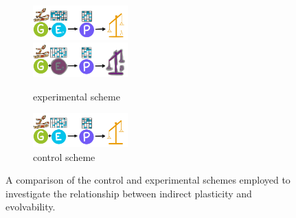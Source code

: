 \begin{figure}
  \centering
  \begin{subfigure}[b]{\textwidth}
    \centering
    \includegraphics[width=0.4\textwidth]{img/indirectschemeA} \\
    \includegraphics[width=0.4\textwidth]{img/indirectschemeB}
    \caption{experimental scheme}
    \label{subfig:directscheme}
  \end{subfigure}
  \hfill
  \begin{subfigure}[b]{\textwidth}
    \centering
    \includegraphics[width=0.4\textwidth]{img/modelscheme}
    \caption{control scheme}
     \label{subfig:controlscheme}
  \end{subfigure}
  \captionsetup{singlelinecheck=off,justification=raggedright}
  \caption{A comparison of the control and experimental schemes employed to investigate the relationship between indirect plasticity and evolvability.}
  \label{fig:direct_plasticity_scheme}
\end{figure}